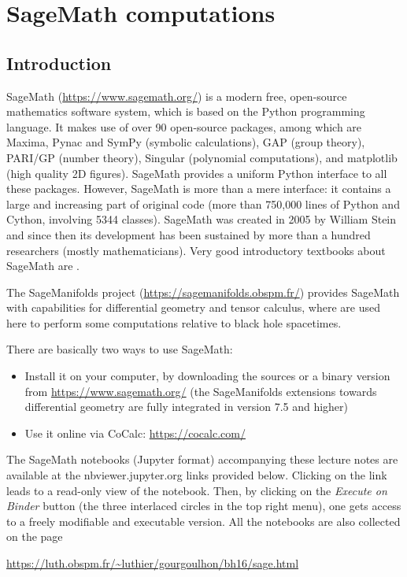 \chapter{SageMath computations} \label{s:sam}

\minitoc

\section{Introduction}


\textsf{SageMath} (\url{https://www.sagemath.org/}) is a modern free,
open-source mathematics software system, which is
based on the Python programming language. It makes use of over 90 open-source packages,
among which are \textsf{Maxima}, \textsf{Pynac} and \textsf{SymPy} (symbolic calculations),
\textsf{GAP} (group theory),
\textsf{PARI/GP} (number theory), \textsf{Singular} (polynomial computations),
and \textsf{matplotlib} (high quality 2D figures).
\textsf{SageMath} provides a uniform Python interface to all these packages. However,
\textsf{SageMath} is more than a mere interface: it contains a large and increasing part of
original code (more than 750,000 lines of Python and Cython, involving 5344 classes).
\textsf{SageMath} was created in 2005 by William Stein \cite{SteinJ05} and since
then its development has been sustained by more than a hundred researchers
(mostly mathematicians). Very good introductory textbooks about \textsf{SageMath} are
\cite{Zimme18,JoyneS14,Bard15}.

The \textsf{SageManifolds} project (\url{https://sagemanifolds.obspm.fr/})
provides \textsf{SageMath} with capabilities for differential geometry and tensor calculus,
where are used here to perform some computations relative to black hole spacetimes.


There are basically two ways to use \textsf{SageMath}:
\begin{itemize}
\item Install it on your computer, by downloading the sources or a binary version
from \url{https://www.sagemath.org/} (the \textsf{SageManifolds} extensions towards
differential geometry are fully integrated in version 7.5 and higher)
\item Use it online via \textsf{CoCalc}: \url{https://cocalc.com/}
\end{itemize}


The SageMath notebooks (Jupyter format) accompanying these lecture notes are available
at the \textsf{nbviewer.jupyter.org} links provided below.
Clicking on the link leads to a read-only view of the notebook. Then,
by clicking on the \emph{Execute on Binder} button (the three interlaced circles
in the top right menu), one gets access to a freely modifiable and executable version.
All the notebooks are also collected on the page
\centerline{
\url{https://luth.obspm.fr/~luthier/gourgoulhon/bh16/sage.html}}

